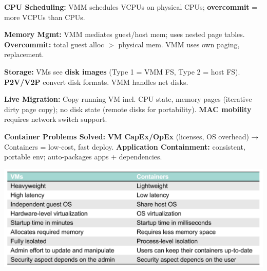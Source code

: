 \textbf{CPU Scheduling:} VMM schedules VCPUs on physical CPUs; \textbf{overcommit} = more VCPUs than CPUs.

\textbf{Memory Mgmt:} VMM mediates guest/host mem; uses nested page tables. \textbf{Overcommit:} total guest alloc $>$ physical mem. VMM uses own paging, replacement.

\textbf{Storage:} VMs see \textbf{disk images} (Type 1 = VMM FS, Type 2 = host FS). \textbf{P2V/V2P} convert disk formats. VMM handles net disks.

\textbf{Live Migration:} Copy running VM incl. CPU state, memory pages (iterative dirty page copy); no disk state (remote disks for portability). \textbf{MAC mobility} requires network switch support.

\textbf{Container Problems Solved:} \textbf{VM CapEx/OpEx} (licenses, OS overhead) → Containers = low-cost, fast deploy. \textbf{Application Containment:} consistent, portable env; auto-packages apps + dependencies.

\includegraphics[width=0.95\linewidth]{images/07_p41_vm_vs_cont.png}

